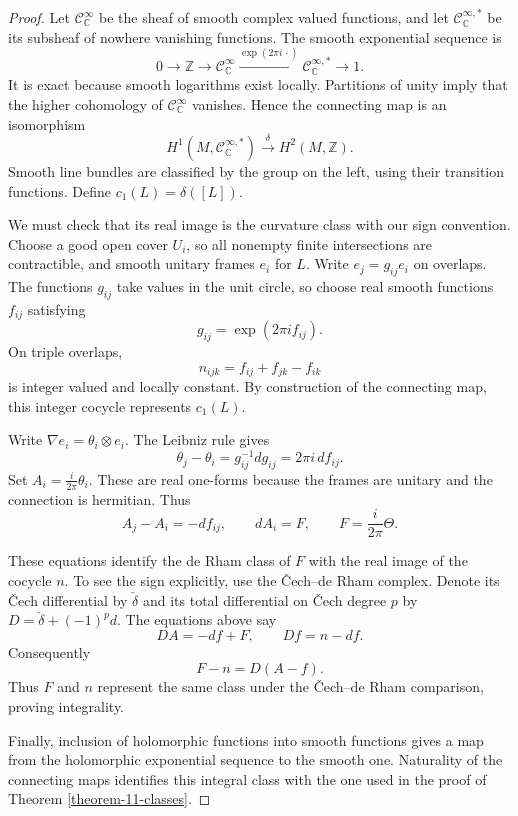 \begin{proof}
Let $\mathcal{C}^{\infty}_{\mathbb{C}}$
be the sheaf of smooth complex valued
functions, and let
$\mathcal{C}^{\infty,*}_{\mathbb{C}}$
be its subsheaf of nowhere vanishing
functions. The smooth exponential
sequence is
$$
0\longrightarrow\mathbb{Z}
\longrightarrow
\mathcal{C}^{\infty}_{\mathbb{C}}
\xrightarrow{\exp(2\pi i\,\cdot)}
\mathcal{C}^{\infty,*}_{\mathbb{C}}
\longrightarrow 1.
$$
It is exact because smooth logarithms
exist locally. Partitions of unity
imply that the higher cohomology of
$\mathcal{C}^{\infty}_{\mathbb{C}}$
vanishes. Hence the connecting map is
an isomorphism
$$
H^1(M,\mathcal{C}^{\infty,*}_{\mathbb{C}})
\xrightarrow{\delta}
H^2(M,\mathbb{Z}).
$$
Smooth line bundles are classified by
the group on the left, using their
transition functions. Define
$c_1(L)=\delta([L])$.

We must check that its real image is
the curvature class with our sign
convention. Choose a good open cover
$U_i$, so all nonempty finite
intersections are contractible, and
smooth unitary frames $e_i$ for $L$.
Write $e_j=g_{ij}e_i$ on overlaps.
The functions $g_{ij}$ take values in
the unit circle, so choose real smooth
functions $f_{ij}$ satisfying
$$
g_{ij}=\exp(2\pi i f_{ij}).
$$
On triple overlaps,
$$
n_{ijk}=f_{ij}+f_{jk}-f_{ik}
$$
is integer valued and locally constant.
By construction of the connecting map,
this integer cocycle represents $c_1(L)$.

Write $\nabla e_i=\theta_i\otimes e_i$.
The Leibniz rule gives
$$
\theta_j-\theta_i
=g_{ij}^{-1}dg_{ij}
=2\pi i\,df_{ij}.
$$
Set $A_i=\frac{i}{2\pi}\theta_i$.
These are real one-forms because the
frames are unitary and the connection
is hermitian. Thus
$$
A_j-A_i=-df_{ij},\qquad
dA_i=F,\qquad
F=\frac{i}{2\pi}\Theta.
$$

These equations identify the de Rham
class of $F$ with the real image of
the cocycle $n$. To see the sign
explicitly, use the Čech--de Rham
complex. Denote its Čech differential
by $\check\delta$ and its total
differential on Čech degree $p$ by
$D=\check\delta+(-1)^p d$.
The equations above say
$$
DA=-df+F,\qquad Df=n-df.
$$
Consequently
$$
F-n=D(A-f).
$$
Thus $F$ and $n$ represent the same
class under the Čech--de Rham
comparison, proving integrality.

Finally, inclusion of holomorphic
functions into smooth functions gives
a map from the holomorphic exponential
sequence to the smooth one.
Naturality of the connecting maps
identifies this integral class with
the one used in the proof of
Theorem \ref{theorem-11-classes}.
\end{proof}

